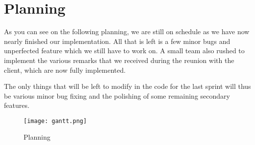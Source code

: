 \section{Planning}

As you can see on the following planning, we are still on schedule as we have now nearly finished our implementation. All that is left is a few minor bugs and unperfected feature which we still have to work on. A small team also rushed to implement the various remarks that we received during the reunion with the client, which are now fully implemented. \newline

The only things that will be left to modify in the code for the last sprint will thus be various minor bug fixing and the polishing of some remaining secondary features.

\begin{figure}[!ht]
	\centering
	\texttt{[image: gantt.png]}
	\caption{Planning}
	\label{fig:length_eight_mouse}
\end{figure}
\FloatBarrier
